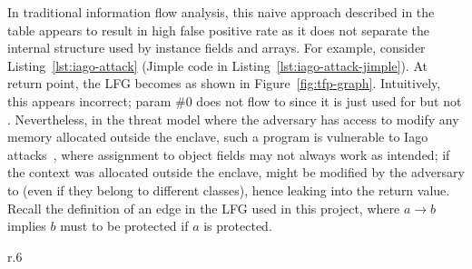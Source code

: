 In traditional information flow analysis,
this naive approach described in the table appears to result in high false positive rate
as it does not separate the internal structure used by instance fields and arrays.
For example, consider Listing~\ref{lst:iago-attack}
(Jimple code in Listing~\ref{lst:iago-attack-jimple}).
At return point, the \ac{LFG} becomes as shown in Figure~\ref{fig:tfp-graph}.
Intuitively, this appears incorrect;
param \#0 does not flow to 
since it is just used for  but not .
Nevertheless, in the threat model where
the adversary has access to modify any memory allocated outside the enclave,
such a program is vulnerable to Iago attacks~\cite{iago},
where assignment to object fields may not always work as intended;
if the  context was allocated outside the enclave,
 might be modified by the adversary to 
(even if they belong to different classes),
hence leaking into the return value.
Recall the definition of an edge in the \ac{LFG} used in this project,
where $a \to b$ implies $b$ must to be protected if $a$ is protected.

\begin{wrapfigure}{r}{.6\textwidth}
	\vspace{-2em}
	\caption{\ac{LFG} of  in Listing~\ref{lst:iago-attack}}
	\begin{center}
	\end{center}
	\vspace{-2em}
	\label{fig:tfp-graph}
\end{wrapfigure}
